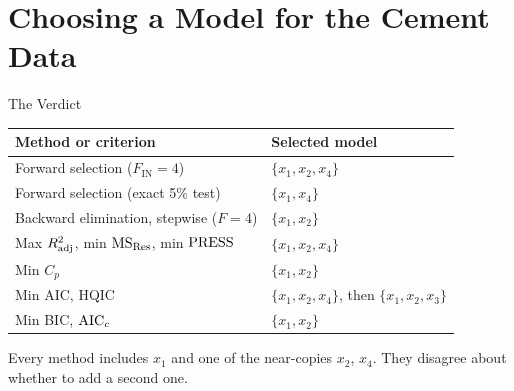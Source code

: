 

\section{Choosing a Model for the Cement Data}


\begin{frame}{The Verdict}
    \begin{center}
        \small
        \begin{tabular}{ll}
            \toprule
            Method or criterion & Selected model \\
            \midrule
            Forward selection ($F_{\text{IN}}=4$) & $\{x_1,x_2,x_4\}$ \\
            Forward selection (exact 5\% test) & $\{x_1,x_4\}$ \\
            Backward elimination, stepwise ($F=4$) & $\{x_1,x_2\}$ \\
            Max $R^2_{\mathrm{adj}}$, min $\mathrm{MS}_{\mathrm{Res}}$, min $\mathrm{PRESS}$ & $\{x_1,x_2,x_4\}$ \\
            Min $C_p$ & $\{x_1,x_2\}$ \\
            Min AIC, HQIC & $\{x_1,x_2,x_4\}$, then $\{x_1,x_2,x_3\}$ \\
            Min BIC, $\mathrm{AIC}_{c}$ & $\{x_1,x_2\}$ \\
            \bottomrule
        \end{tabular}
    \end{center}
    Every method includes $x_1$ and one of the near-copies $x_2$, $x_4$. They disagree about whether to add a second one.
\end{frame}


